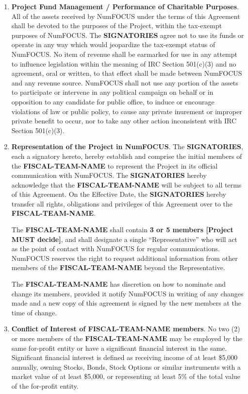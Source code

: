 \documentclass[english,letterpaper,12pt]{article}
\newcommand{\signatories}{\textbf{SIGNATORIES}}
\newcommand{\fiscalteam}{\textbf{FISCAL-TEAM-NAME}}
\newcommand{\teamsize}{\textbf{3 or 5 members [Project MUST decide]}}
\begin{document}
\begin{enumerate}[label=\arabic*.,ref=\S~\arabic*]
  
\item \textbf{Project Fund Management / Performance of Charitable
  Purposes}. \label{CharitablePurpose} All of the assets received by NumFOCUS
  under the terms of this Agreement shall be devoted to the purposes of the
  Project, within the tax-exempt purposes of NumFOCUS. The \signatories{} agree
  not to use its funds or operate in any way which would jeopardize the
  tax-exempt status of NumFOCUS. No item of revenue shall be earmarked for use
  in any attempt to influence legislation within the meaning of IRC Section
  501(c)(3) and no agreement, oral or written, to that effect shall be made
  between NumFOCUS and any revenue source. NumFOCUS shall not use any portion
  of the assets to participate or intervene in any political campaign on behalf
  or in opposition to any candidate for public office, to induce or encourage
  violations of law or public policy, to cause any private inurement or
  improper private benefit to occur, nor to take any other action inconsistent
  with IRC Section 501(c)(3).

\item \textbf{Representation of the Project in
  NumFOCUS}. \label{Representation}The \signatories{}, each a signatory hereto,
  hereby establish and comprise the initial members of the \fiscalteam{} to
  represent the Project in its official communication with NumFOCUS.  The
  \signatories{} hereby acknowledge that the \fiscalteam{} will be subject
  to all terms of this Agreement.  On the Effective Date, the \signatories{}
  hereby transfer all rights, obligations and privileges of this Agreement over
  to the \fiscalteam{}.

  The \fiscalteam{} shall contain \teamsize{}, and shall designate a single
  ``Representative'' who will act as the point of contact with NumFOCUS for
  regular communications.  NumFOCUS reserves the right to request additional
  information from other members of the \fiscalteam{} beyond the
  Representative.

  The \fiscalteam{} has discretion on how to nominate and change its
  members, provided it notify NumFOCUS in writing of any changes made and a new
  copy of this agreement is signed by the new members at the time of change.

\item \textbf{Conflict of Interest of \fiscalteam{} members}. No two (2) or
  more members of the \fiscalteam{} may be employed by the same for-profit
  entity or have a significant financial interest in the same. Significant
  financial interest is defined as receiving income of at least \$5,000
  annually, owning Stocks, Bonds, Stock Options or similar instruments with a
  market value of at least \$5,000, or representing at least 5\% of the total
  value of the for-profit entity.


\end{enumerate}
\end{document}
